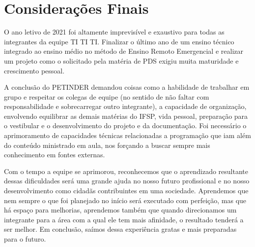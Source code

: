 \chapter{Considerações Finais}
O ano letivo de 2021 foi altamente imprevisível e exaustivo para todas as integrantes da equipe TI TI TI. Finalizar o último ano de um ensino técnico integrado ao ensino médio no método de Ensino Remoto Emergencial e realizar um projeto como o solicitado pela matéria de \ac{PDS} exigiu muita maturidade e crescimento pessoal.

A conclusão do PETINDER demandou coisas como a habilidade de trabalhar em grupo e respeitar os colegas de equipe (no sentido de não faltar com responsabilidade e sobrecarregar outro integrante), a capacidade de organização, envolvendo equilibrar as demais matérias do \ac{IFSP}, vida pessoal, preparação para o vestibular e o desenvolvimento do projeto e da documentação. Foi necessário o aprimoramento de capacidades técnicas relacionadas a programação que iam além do conteúdo ministrado em aula, nos forçando a buscar sempre mais conhecimento em fontes externas.

Com o tempo a equipe se aprimorou, reconhecemos que o aprendizado resultante dessas dificuldades será uma grande ajuda no nosso futuro profissional e no nosso desenvolvimento como cidadãs contribuintes em uma sociedade. Aprendemos que nem sempre o que foi planejado no início será executado com perfeição, mas que há espaço para melhorias, aprendemos também que quando direcionamos um integrante para a área com a qual ele tem mais afinidade, o resultado tenderá a ser melhor. Em conclusão, saímos dessa experiência gratas e mais preparadas para o futuro.

